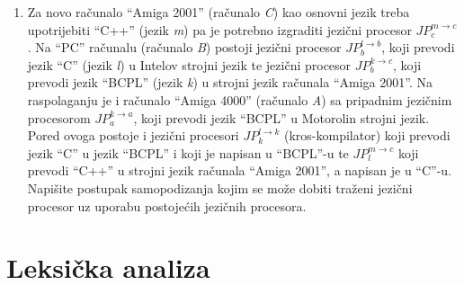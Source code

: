 \documentclass[times, 12pt, utf8]{book}
\newcommand{\JP}[3]{\(JP_{#1}^{#2 \to #3}\)}
\begin{document}
\begin{enumerate}
\item
Za novo računalo “Amiga 2001” (računalo \textit{C}) kao osnovni jezik treba upotrijebiti “C++” (jezik \textit{m}) pa je potrebno izgraditi jezični procesor \JP{c}{m}{c}.
Na “PC” računalu (računalo \textit{B}) postoji jezični procesor \JP{b}{l}{b}, koji prevodi jezik “C” (jezik \textit{l}) u Intelov strojni jezik te jezični procesor \JP{b}{k}{c}, koji prevodi jezik “BCPL” (jezik \textit{k}) u strojni jezik računala “Amiga 2001”.
Na raspolaganju je i računalo “Amiga 4000” (računalo \textit{A}) sa pripadnim jezičnim procesorom \JP{a}{k}{a}, koji prevodi jezik “BCPL” u Motorolin strojni jezik.
Pored ovoga postoje i jezični procesori \JP{k}{l}{k} (kros-kompilator) koji prevodi jezik “C” u jezik “BCPL” i koji je napisan u “BCPL”-u te \JP{l}{m}{c} koji prevodi “C++” u strojni jezik računala “Amiga 2001”, a napisan je u “C”-u.
Napišite postupak samopodizanja kojim se može dobiti traženi jezični procesor uz uporabu postojećih jezičnih procesora. \cite[str.~27]{udzbenik} \cite{auditorne}

\end{enumerate}


\chapter{Leksička analiza}

\end{document}
